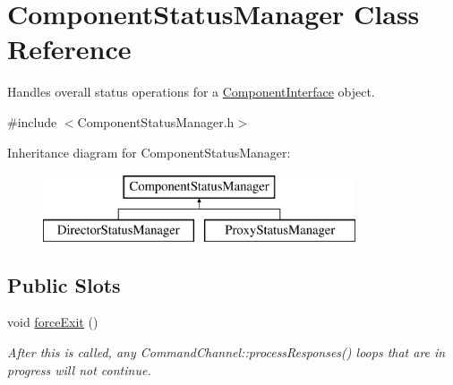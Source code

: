 \hypertarget{class_component_status_manager}{\section{Component\-Status\-Manager Class Reference}
\label{class_component_status_manager}
}


Handles overall status operations for a \hyperlink{class_component_interface}{Component\-Interface} object.  




{\ttfamily \#include $<$Component\-Status\-Manager.\-h$>$}

Inheritance diagram for Component\-Status\-Manager\-:\begin{figure}[H]
\begin{center}
\leavevmode
\includegraphics[height=2.000000cm]{class_component_status_manager}
\end{center}
\end{figure}
\subsection*{Public Slots}
\begin{DoxyCompactItemize}
\item 
void \hyperlink{class_component_status_manager_a2fd4ac0e719ade2c696dd8b468c76f07}{force\-Exit} ()
\begin{DoxyCompactList}\small\item\em After this is called, any Command\-Channel\-::process\-Responses() loops that are in progress will not continue. \end{DoxyCompactList}\end{DoxyCompactItemize}
